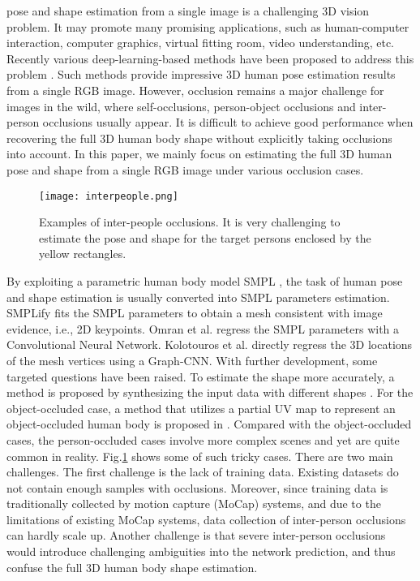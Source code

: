 \documentclass[journal]{IEEEtran}
\begin{document}
 pose and shape estimation from a single image is a challenging 3D vision problem. It may promote many promising applications, such as human-computer interaction, computer graphics, virtual fitting room, video understanding, etc. Recently   various deep-learning-based methods have been proposed to address this problem \cite{SMPL-X:2019,kolotouros2019spin,zanfir2018monocular,tan2017indirect,pavlakos2018learning}. Such methods provide impressive 3D human pose estimation results from a single RGB image. However, occlusion remains a major challenge for images in the wild, where self-occlusions, person-object occlusions and inter-person occlusions usually appear. It is difficult to achieve good performance when recovering the full 3D human body shape without explicitly taking occlusions into account. In this paper, we mainly focus on estimating the full 3D human pose and shape from a single RGB image under various occlusion cases.

\begin{figure}
    \centerline{\texttt{[image: interpeople.png]}}
    \caption{Examples of inter-people occlusions. It is very challenging to estimate the pose and shape for the target persons enclosed by the yellow rectangles.}
    \label{fig:interpeople}
    \vspace{-0.2cm}
\end{figure}


By exploiting a parametric human body model SMPL \cite{SMPL:2015}, the task of human pose and shape estimation is usually converted into SMPL parameters estimation. SMPLify \cite{Bogo:ECCV:2016} fits the SMPL parameters to obtain a mesh consistent with image evidence, i.e., 2D keypoints. Omran et al. \cite{omran2018neural} regress the SMPL parameters with a Convolutional Neural Network. Kolotouros et al. \cite{kolotouros2019convolutional} directly regress the 3D locations of the mesh vertices using a Graph-CNN. With further development, some targeted questions have been raised. To estimate the shape more accurately, a method is proposed by synthesizing the input data with different shapes \cite{STRAPS2020BMVC}. For the object-occluded case, a method that utilizes a partial UV map to represent an object-occluded human body is proposed in \cite{zhang2020object} . Compared with the object-occluded cases, the person-occluded cases involve more complex scenes and yet are quite common in reality. Fig.\ref{fig:interpeople} shows some of such tricky cases. There are two main challenges. The first challenge is the lack of training data.  Existing datasets do not contain enough samples with occlusions. Moreover, since training data is traditionally collected by motion capture (MoCap) systems, and due to the limitations of existing MoCap systems, data collection of inter-person occlusions can hardly scale up. Another challenge is that severe inter-person occlusions would introduce challenging ambiguities into the network prediction, and thus confuse the full 3D human body shape estimation.
\end{document}
